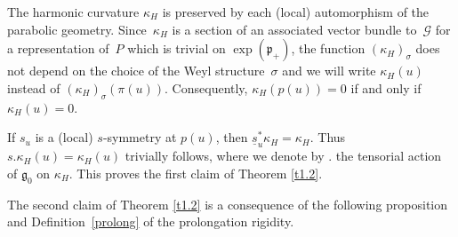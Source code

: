 \documentclass[pdftex]{sigma}
\newcommand{\ka}{\kappa}
\newcommand{\si}{\sigma}
\newcommand{\un}{\underline}
\newcommand{\ba}{\mathcal{G}}
\newcommand{\fg}{\mathfrak g}
\newcommand{\fp}{\mathfrak p}
\numberwithin{equation}{section}
\begin{document}
The harmonic curvature $\ka_H$ is preserved by each (local) automorphism of the parabolic geometry. Since~$\kappa_H$ is a section of an associated vector bundle to~$\ba$ for a representation of~$P$ which is trivial on $\exp(\fp_+)$, the function $(\kappa_H)_\si$ does not depend on the choice of the Weyl structure~$\si$ and we will write $\kappa_H(u)$ instead of $(\kappa_H)_\si(\pi(u))$. Consequently, $\kappa_H(p(u))=0$ if and only if $\kappa_H(u)=0$.

If $s_u$ is a (local) $s$-symmetry at $p(u)$, then $\un s_u^*\kappa_H=\kappa_H$. Thus $s.\kappa_H(u)=\kappa_H(u)$ trivially follows, where we denote by $.$ the tensorial action of $\fg_0$ on $\kappa_H$. This proves the f\/irst claim of Theorem \ref{t1.2}.

The second claim of Theorem \ref{t1.2} is a consequence of the following proposition and Def\/i\-ni\-tion~\ref{prolong} of the prolongation rigidity.
\end{document}
